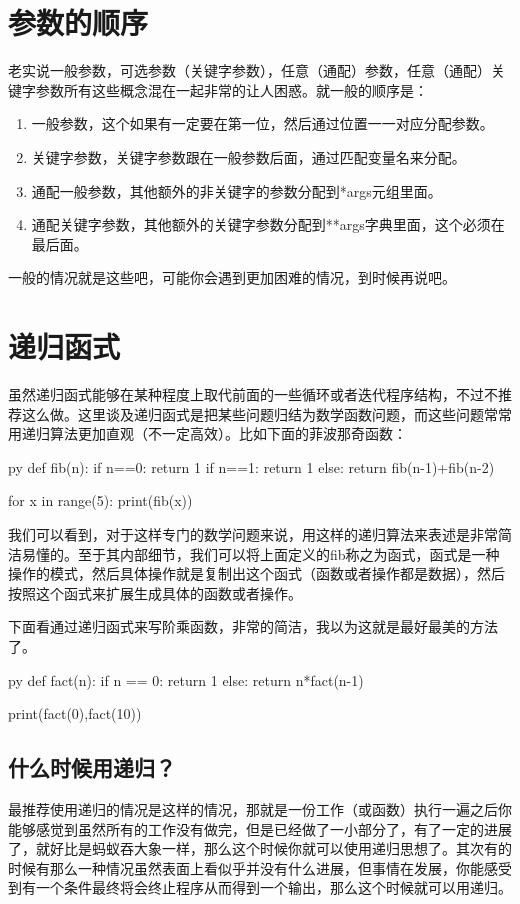 \documentclass[12pt,oneside]{book}
\begin{document}
\begin{common-format}
\section{参数的顺序}
老实说一般参数，可选参数（关键字参数），任意（通配）参数，任意（通配）关键字参数所有这些概念混在一起非常的让人困惑。就一般的顺序是：
\begin{enumerate}
\item 一般参数，这个如果有一定要在第一位，然后通过位置一一对应分配参数。
\item 关键字参数，关键字参数跟在一般参数后面，通过匹配变量名来分配。
\item 通配一般参数，其他额外的非关键字的参数分配到*args元组里面。
\item 通配关键字参数，其他额外的关键字参数分配到**args字典里面，这个必须在最后面。
\end{enumerate}
一般的情况就是这些吧，可能你会遇到更加困难的情况，到时候再说吧。



\section{递归函式}
\label{sec:递归函式}
虽然递归函式能够在某种程度上取代前面的一些循环或者迭代程序结构，不过不推荐这么做。这里谈及递归函式是把某些问题归结为数学函数问题，而这些问题常常用递归算法更加直观（不一定高效）。比如下面的菲波那奇函数：
\begin{xverbatim}[129]{py}
def fib(n):
    if n==0:
        return 1
    if n==1:
        return 1
    else:
        return fib(n-1)+fib(n-2)
        
for x in range(5):
    print(fib(x))
\end{xverbatim}
我们可以看到，对于这样专门的数学问题来说，用这样的递归算法来表述是非常简洁易懂的。至于其内部细节，我们可以将上面定义的fib称之为函式，函式是一种操作的模式，然后具体操作就是复制出这个函式（函数或者操作都是数据），然后按照这个函式来扩展生成具体的函数或者操作。

下面看通过递归函式来写阶乘函数，非常的简洁，我以为这就是最好最美的方法了。
\begin{xverbatim}[129]{py}
def fact(n):
    if n == 0:
        return 1
    else:
        return n*fact(n-1)
        
print(fact(0),fact(10))
\end{xverbatim}

\subsection{什么时候用递归？}
最推荐使用递归的情况是这样的情况，那就是一份工作（或函数）执行一遍之后你能够感觉到虽然所有的工作没有做完，但是已经做了一小部分了，有了一定的进展了，就好比是蚂蚁吞大象一样，那么这个时候你就可以使用递归思想了。其次有的时候有那么一种情况虽然表面上看似乎并没有什么进展，但事情在发展，你能感受到有一个条件最终将会终止程序从而得到一个输出，那么这个时候就可以用递归。


\end{common-format}
\end{document}
